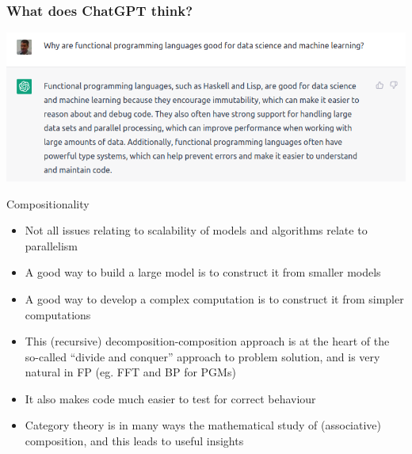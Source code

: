 \documentclass[mathserif,handout]{beamer}
\begin{document}
\begin{frame}
  \frametitle{What does ChatGPT think?}
\centerline{\includegraphics[width=\textwidth]{cgpt1}}
\end{frame}


\begin{frame}{Compositionality}
\protect\hypertarget{compositionality}{}

\begin{itemize}

\item
  Not all issues relating to scalability of models and algorithms relate
  to parallelism
\item
  A good way to build a large model is to construct it from smaller
  models
\item
  A good way to develop a complex computation is to construct it from
  simpler computations
\item
  This (recursive) decomposition-composition approach is at the heart of
  the so-called ``divide and conquer'' approach to problem solution, and
  is very natural in FP (eg. FFT and BP for PGMs)
\item
  It also makes code much easier to \alert{test} for correct behaviour
\item
  Category theory is in many ways the mathematical study of
  (associative) composition, and this leads to useful insights
\end{itemize}

\end{frame}
\end{document}
